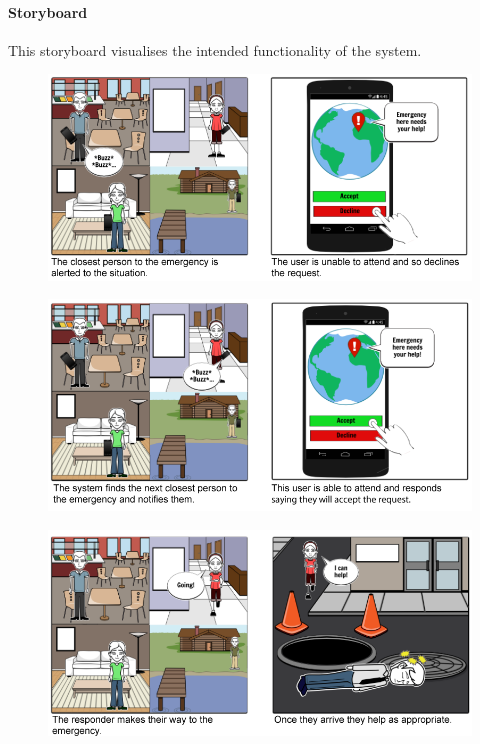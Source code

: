 \documentclass{article}
\begin{document}
		\paragraph{Storyboard}
		This storyboard visualises the intended functionality of the system.
	\begin{figure}[H]
		\centering
		\includegraphics[width=1\textwidth]{"Iteration2/Storyboard - Iteration 1 - 1"}
	\end{figure}
	\begin{figure}[H]
		\centering
		\includegraphics[width=1\textwidth]{"Iteration2/Storyboard - Iteration 1 - 2"}
	\end{figure}
	\begin{figure}[H]
		\centering
		\includegraphics[width=1\textwidth]{"Iteration2/Storyboard - Iteration 1 - 3"}
	\end{figure}
\end{document}

